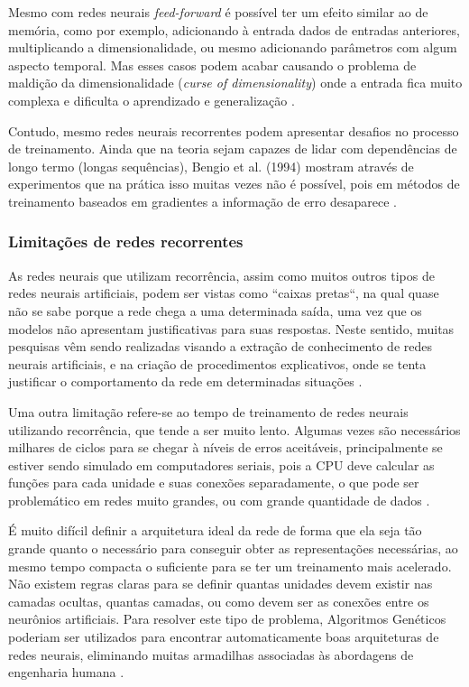 Mesmo com redes neurais \textit{feed-forward} é possível ter um efeito similar ao de memória, como por exemplo, adicionando à entrada dados de entradas anteriores, multiplicando a dimensionalidade, ou mesmo adicionando parâmetros com algum aspecto temporal. Mas esses casos podem acabar causando o problema de maldição da dimensionalidade (\textit{curse of dimensionality}) onde a entrada fica muito complexa e dificulta o aprendizado e generalização \cite{rede-recorrente}.

Contudo, mesmo redes neurais recorrentes podem apresentar desafios no processo de treinamento. Ainda que na teoria sejam capazes de lidar com dependências de longo termo (longas sequências), Bengio et al. (1994) mostram através de experimentos que na prática isso muitas vezes não é possível, pois em métodos de treinamento baseados em gradientes a informação de erro desaparece \cite{rede-recorrente}.

\subsubsection{Limitações de redes recorrentes}

As redes neurais que utilizam recorrência, assim como muitos outros tipos de redes neurais artificiais, podem ser vistas como ``caixas pretas``, na qual quase não se sabe porque a rede chega a uma determinada saída, uma vez que os modelos não apresentam justificativas para suas respostas. Neste sentido, muitas pesquisas vêm sendo realizadas visando a extração de conhecimento de redes neurais artificiais, e na criação de procedimentos explicativos, onde se tenta justificar o comportamento da rede em determinadas situações  \cite{aplicacao}.

Uma outra limitação refere-se ao tempo de treinamento de redes neurais utilizando recorrência, que tende a ser muito lento. Algumas vezes são necessários milhares de ciclos para se chegar à níveis de erros aceitáveis, principalmente se estiver sendo simulado em computadores seriais, pois a CPU deve calcular as funções para cada unidade e suas conexões separadamente, o que pode ser problemático em redes muito grandes, ou com grande quantidade de dados \cite{aplicacao}.

É muito difícil definir a arquitetura ideal da rede de forma que ela seja tão grande quanto o necessário para conseguir obter as representações necessárias, ao mesmo tempo compacta o suficiente para se ter um treinamento mais acelerado. Não existem regras claras para se definir quantas unidades devem existir nas camadas ocultas, quantas camadas, ou como devem ser as conexões entre os neurônios artificiais. Para resolver este tipo de problema, Algoritmos Genéticos poderiam ser utilizados para encontrar automaticamente boas arquiteturas de redes neurais, eliminando muitas armadilhas associadas às abordagens de engenharia humana \cite{aplicacao}.
